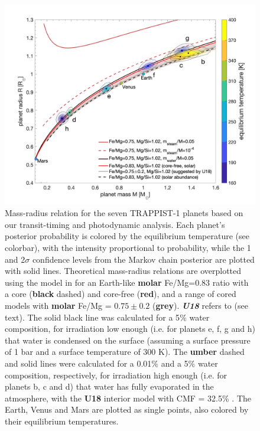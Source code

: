 \documentclass[twocolumn]{aastex63}
\begin{document}
\begin{figure}
    \centering
    \includegraphics[width=\hsize]{figures/Figure_MR_v8.png}
    {Mass-radius relation for the seven TRAPPIST-1 planets based on
        our transit-timing and photodynamic analysis.
        Each planet's posterior probability is colored by the equilibrium temperature
        (see colorbar), with the intensity proportional to probability, while the 1 and 2$\sigma$
        confidence levels from the Markov chain posterior are plotted with solid lines.
        Theoretical mass-radius relations are overplotted using the model in \citet{Dorn2016} for an Earth-like \textbf{molar} Fe/Mg=0.83 ratio with a core (\textbf{black} dashed) and core-free (\textbf{red}), and a range of cored models with \textbf{molar} Fe/Mg = $0.75{\pm}0.2$ (\textbf{grey}).  \textbf{{\it U18}} refers to \citet{Unterborn2018a} (see text).
        The solid black line was calculated for a 5$\%$ water composition, for irradiation low enough (i.e. for planets e, f, g and h) that water is condensed on the surface  (assuming a surface pressure of 1 bar and a surface temperature of 300 K). The \textbf{umber} dashed and solid lines were calculated for a 0.01$\%$ and a 5$\%$ water composition, respectively, for irradiation high enough (i.e. for planets b, c and d) that water has fully evaporated in the atmosphere, with the \textbf{U18} interior model with CMF = 32.5\% \citep{Turbet2020}.
        The Earth, Venus and Mars are plotted as single points, also colored by their equilibrium temperatures.}
    \label{fig:mass_radius_relation}
\end{figure}
\end{document}
